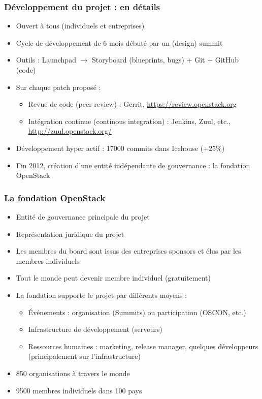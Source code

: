   \begin{frame}
    \frametitle{Développement du projet : en détails}
    \begin{itemize}
      \item Ouvert à tous (individuels et entreprises)\pause
      \item Cycle de développement de 6 mois débuté par un (design) summit\pause
      \item Outils : Launchpad $\rightarrow$ Storyboard (blueprints, bugs) + Git + GitHub (code)\pause
      \item Sur chaque patch proposé :
      \begin{itemize}
        \item Revue de code (peer review) : Gerrit, \url{https://review.openstack.org}
        \item Intégration continue (continous integration) : Jenkins, Zuul, etc., \url{http://zuul.openstack.org/}
      \end{itemize}\pause
      \item Développement hyper actif : 17000 commits dans Icehouse (+25\%)\pause
      \item Fin 2012, création d'une entité indépendante de gouvernance : la fondation OpenStack
    \end{itemize}
  \end{frame}

  \begin{frame}
    \frametitle{La fondation OpenStack}
    \begin{itemize}
      \item Entité de gouvernance principale du projet
      \item Représentation juridique du projet
      \item Les membres du board sont issus des entreprises sponsors et élus par les membres individuels
      \item Tout le monde peut devenir membre individuel (gratuitement)
      \item La fondation supporte le projet par différents moyens :
      \begin{itemize}
        \item Événements : organisation (Summits) ou participation (OSCON, etc.)
        \item Infrastructure de développement (serveurs)
        \item Ressources humaines : marketing, release manager, quelques développeurs (principalement sur l'infrastructure)
      \end{itemize}
      \item 850 organisations à travers le monde
      \item 9500 membres individuels dans 100 pays
    \end{itemize}
  \end{frame}

